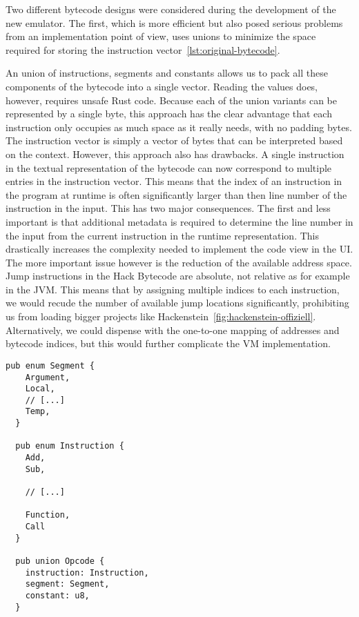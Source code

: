 Two different bytecode designs were considered during the development of the new emulator.
The first, which is more efficient but also posed serious problems from an implementation point of view, uses unions to minimize the space required for storing the instruction vector~\ref{lst:original-bytecode}.

An union of instructions, segments and constants allows us to pack all these components of the bytecode into a single vector. Reading the values does, however, requires unsafe Rust code.
Because each of the union variants can be represented by a single byte, this approach has the clear advantage that each instruction only occupies as much space as it really needs, with no padding bytes. The instruction vector is simply a vector of bytes that can be interpreted based on the context.
However, this approach also has drawbacks. A single instruction in the textual representation of the bytecode can now correspond to multiple entries in the instruction vector. This means that the index of an instruction in the program at runtime is often significantly larger than then line number of the instruction in the input.
This has two major consequences. The first and less important is that additional metadata is required to determine the line number in the input from the current instruction in the runtime representation. This drastically increases the complexity needed to implement the code view in the UI.
The more important issue however is the reduction of the available address space. Jump instructions in the Hack Bytecode are absolute, not relative as for example in the JVM.
This means that by assigning multiple indices to each instruction, we would recude the number of available jump locations significantly, prohibiting us from loading bigger projects like Hackenstein~\ref{fig:hackenstein-offiziell}.
Alternatively, we could dispense with the one-to-one mapping of addresses and bytecode indices, but this would further complicate the VM implementation.

\begin{lstlisting}[label={lst:original-bytecode}]
  pub enum Segment {
    Argument,
    Local,
    // [...]
    Temp,
  }

  pub enum Instruction {
    Add,
    Sub,

    // [...]

    Function,
    Call
  }

  pub union Opcode {
    instruction: Instruction,
    segment: Segment,
    constant: u8,
  }
\end{lstlisting}

